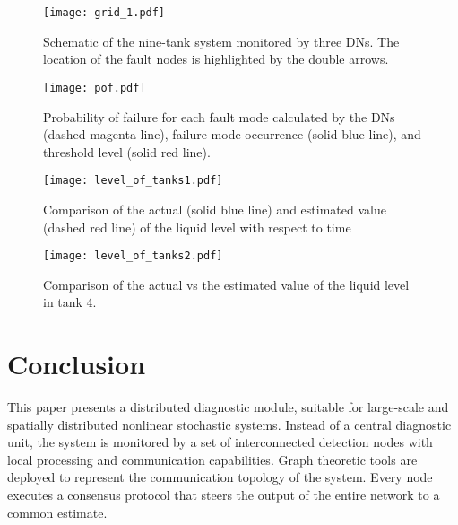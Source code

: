 \documentclass[10pt,twocolumn,twoside]{IEEEtran}
\begin{document}
\begin{figure}
\centering
\texttt{[image: grid\_1.pdf]}
\caption{Schematic of the nine-tank system monitored by three DNs. The location of the fault nodes is highlighted by the double arrows. \label{fig:Schematic-of-the}}
\end{figure}


\begin{figure}
\begin{centering}
\texttt{[image: pof.pdf]}
\par\end{centering}

\caption{Probability of failure for each fault mode calculated by the DNs (dashed magenta line), failure mode occurrence (solid blue line), and threshold level (solid red line).\label{fig:probability-of-failure}}
\end{figure}

\begin{figure}
\centering\texttt{[image: level\_of\_tanks1.pdf]}\caption{Comparison of the actual (solid blue line) and estimated value (dashed red line) of the liquid level with respect to time \label{fig:Comparison-of-the}}
\end{figure}

\begin{figure}
\centering\texttt{[image: level\_of\_tanks2.pdf]}\caption{Comparison of the actual vs the estimated value of the liquid level in tank 4. \label{fig:Comparison-of-the-1}}
\end{figure}

\section{Conclusion}\label{sec:Conclusion}
This paper presents a distributed diagnostic module, suitable for large-scale and spatially distributed nonlinear stochastic systems. Instead of a central diagnostic unit, the system is monitored by a set of interconnected detection nodes with local processing and communication capabilities. Graph theoretic tools are deployed to represent the communication topology of the system. Every node executes a consensus protocol that steers the output of the entire network to a common estimate.  
\end{document}

